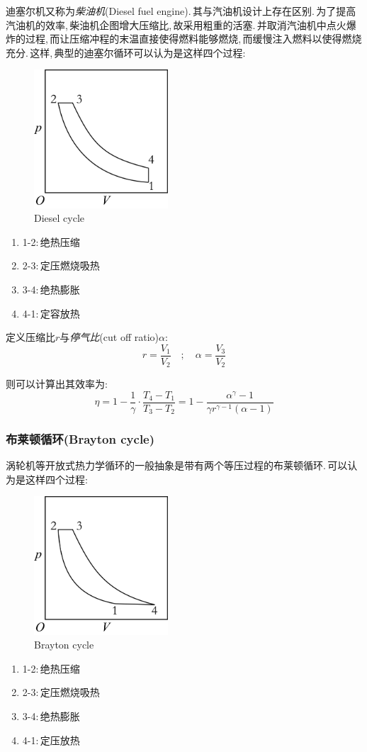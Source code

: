 迪塞尔机又称为\emph{柴油机}(Diesel fuel engine).\,其与汽油机设计上存在区别.\,为了提高汽油机的效率,\,柴油机企图增大压缩比,\,故采用粗重的活塞.\,并取消汽油机中点火爆炸的过程,\,而让压缩冲程的末温直接使得燃料能够燃烧,\,而缓慢注入燃料以使得燃烧充分.\,这样,\,典型的迪塞尔循环可以认为是这样四个过程:
\begin{figure}
\centering
\includegraphics[width=5cm]{image/5-2-8.png}
\caption{Diesel cycle}
\end{figure}
\begin{enumerate}[i]
	\item 1-2:\,绝热压缩
	\item 2-3:\,定压燃烧吸热
	\item 3-4:\,绝热膨胀
	\item 4-1:\,定容放热
\end{enumerate}

定义压缩比$r$与\emph{停气比}(cut off ratio)$\alpha$:
\[r=\frac{V_1}{V_2}\quad ;\quad \alpha=\frac{V_3}{V_2}\]

则可以计算出其效率为:
\[\eta=1-\frac{1}{\gamma}\cdot\frac{T_4-T_1}{T_3-T_2}=1-\frac{\alpha^\gamma-1}{\gamma r^{\gamma-1}(\alpha-1)}\]

\vspace{2cm}

\subsubsection{\hei 布莱顿循环(Brayton cycle)}

涡轮机等开放式热力学循环的一般抽象是带有两个等压过程的布莱顿循环.\,可以认为是这样四个过程:
\begin{figure}
\centering
\includegraphics[width=5cm]{image/5-2-9.png}
\caption{Brayton cycle}
\end{figure}
\begin{enumerate}[i]
	\item 1-2:\,绝热压缩
	\item 2-3:\,定压燃烧吸热
	\item 3-4:\,绝热膨胀
	\item 4-1:\,定压放热
\end{enumerate}

